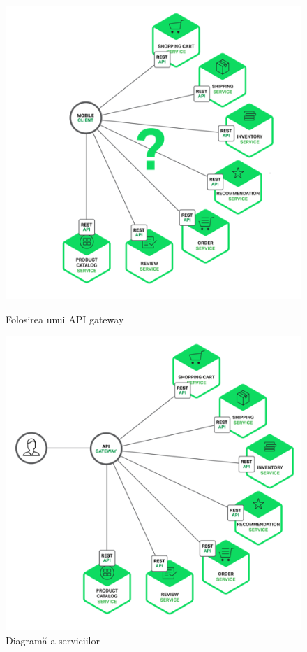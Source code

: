 \documentclass[12pt, a4paper, oneside, romanian]{teza-upb}
\begin{document}
\begin{figure}[ht]
\centering
\begin{minipage}{0.45\textwidth}
\centering
\includegraphics[scale=0.4]{img/Richardson-microservices-part2-2_microservices-client.png}
\caption{Folosirea unui API gateway}
\end{minipage}\hfill
\begin{minipage}{0.45\textwidth}
\centering
\includegraphics[scale=0.4]{img/Richardson-microservices-part2-3_api-gateway.png}
\caption{Diagramă a serviciilor}
\end{minipage}
\end{figure}
\end{document}
